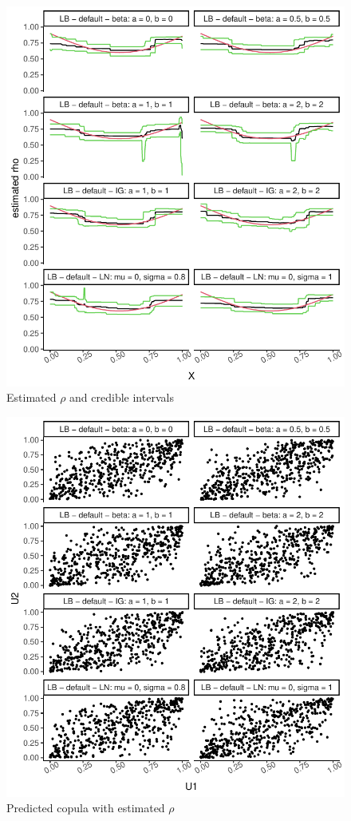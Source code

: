 \documentclass{amsart}
\begin{document}
\begin{figure}[ht]
	\centering
	\includegraphics[width=0.95\linewidth]{predicted_rho_4.pdf}
	\caption{Estimated $\rho$ and credible intervals}
	\label{fig:pred:rho:4}
\end{figure}

\begin{figure}[ht]
	\centering
	\includegraphics[width=0.95\linewidth]{simulated_copula_4.pdf}
	\caption{Predicted copula with estimated $\rho$}
	\label{fig:sim:copula:4}
\end{figure}
\end{document}
